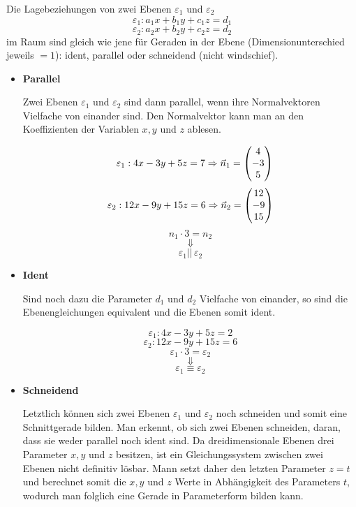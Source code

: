 \pagebreak


Die Lagebeziehungen von zwei Ebenen $\varepsilon_{1}$ und $\varepsilon_{2}$ $$\varepsilon_{1}: a_{1}x + b_{1}y + c_{1}z = d_{1}$$ $$\varepsilon_{2}: a_{2}x + b_{2}y + c_{2}z = d_{2}$$ im Raum sind gleich wie jene f\"{u}r Geraden in der Ebene (Dimensionunterschied jeweils $= 1$): ident, parallel oder schneidend (nicht windschief).

\begin{itemize}

  \item{\textbf{Parallel}}

  Zwei Ebenen $\varepsilon_{1}$ und $\varepsilon_{2}$ sind dann parallel, wenn ihre Normalvektoren Vielfache von einander sind. Den Normalvektor kann man an den Koeffizienten der Variablen $x, y$ und $z$ ablesen.

  $$\,\,\,\,\, \varepsilon_{1}: 4x - 3y + 5z = 7 \Rightarrow \vec{n}_{1} = \begin{pmatrix}4 \\ -3 \\ 5\end{pmatrix}$$
  $$\varepsilon_{2}: 12x -9y + 15z = 6 \Rightarrow \vec{n}_{2} = \begin{pmatrix}12 \\ -9 \\ 15\end{pmatrix}$$
  $$n_{1} \cdot 3 = n_{2}$$
 $$\Downarrow$$ 
 $$\varepsilon_1 || \, \varepsilon_2$$

  \item{\textbf{Ident}}

  Sind noch dazu die Parameter $d_{1}$ und $d_{2}$ Vielfache von einander, so sind die Ebenengleichungen equivalent und die Ebenen somit ident.

  $$\varepsilon_{1}: 4x - 3y + 5z = 2$$
  $$\varepsilon_{2}: 12x -9y + 15z = 6$$
  $$\varepsilon_{1} \cdot 3 = \varepsilon_{2}$$
  $$\Downarrow$$ 
  $$ \varepsilon_1 \equiv \varepsilon_2$$

  \item{\textbf{Schneidend}}

  Letztlich k\"{o}nnen sich zwei Ebenen $\varepsilon_{1}$ und $\varepsilon_{2}$ noch schneiden und somit eine Schnittgerade bilden. Man erkennt, ob sich zwei Ebenen schneiden, daran, dass sie weder parallel noch ident sind. Da dreidimensionale Ebenen drei Parameter $x, y$ und $z$ besitzen, ist ein Gleichungssystem zwischen zwei Ebenen nicht definitiv l\"{o}sbar. Mann setzt daher den letzten Parameter $z = t$ und berechnet somit die $x, y$ und $z$ Werte in Abh\"{a}ngigkeit des Parameters $t$, wodurch man folglich eine Gerade in Parameterform bilden kann.


\end{itemize}
